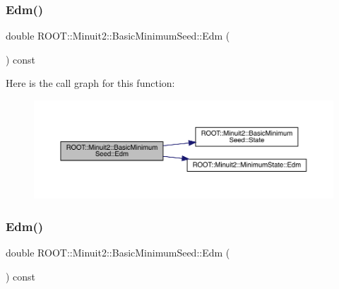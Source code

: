\subsubsection{\texorpdfstring{Edm()}{Edm()}\hspace{0.1cm}{\footnotesize\ttfamily [2/3]}}
{\footnotesize\ttfamily double R\+O\+O\+T\+::\+Minuit2\+::\+Basic\+Minimum\+Seed\+::\+Edm (\begin{DoxyParamCaption}{ }\end{DoxyParamCaption}) const\hspace{0.3cm}{\ttfamily [inline]}}

Here is the call graph for this function\+:
\nopagebreak
\begin{figure}[H]
\begin{center}
\leavevmode
\includegraphics[width=350pt]{de/d50/classROOT_1_1Minuit2_1_1BasicMinimumSeed_a10659878d070bed73df23682eab3e88e_cgraph}
\end{center}
\end{figure}
\mbox{\label{classROOT_1_1Minuit2_1_1BasicMinimumSeed_a10659878d070bed73df23682eab3e88e}} 
\subsubsection{\texorpdfstring{Edm()}{Edm()}\hspace{0.1cm}{\footnotesize\ttfamily [3/3]}}
{\footnotesize\ttfamily double R\+O\+O\+T\+::\+Minuit2\+::\+Basic\+Minimum\+Seed\+::\+Edm (\begin{DoxyParamCaption}{ }\end{DoxyParamCaption}) const\hspace{0.3cm}{\ttfamily [inline]}}

